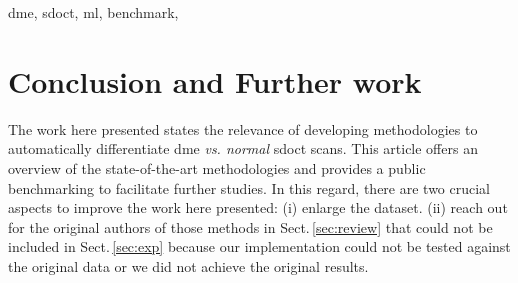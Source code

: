 \documentclass[conference,twocolumn,letterpaper,10pt]{latex/IEEEtran}
\begin{document}
\begin{IEEEkeywords}
  \glsresetall %
  \gls{dme},
  \gls{sdoct},
  \gls{ml},
  benchmark,
\end{IEEEkeywords}

\linenumbers

\glsresetall %





\section{Conclusion and Further work}\label{sec:conclusion}
The work here presented states the relevance of developing methodologies to automatically differentiate \gls{dme} \emph{vs. normal} \gls{sdoct} scans.
This article offers an overview of the state-of-the-art methodologies and provides a public benchmarking to facilitate further studies.
In this regard, there are two crucial aspects to improve the work here presented:
(i) enlarge the dataset.
(ii) reach out for the original authors of those methods in Sect.\,\ref{sec:review} that could not be included in Sect.\,\ref{sec:exp} because our implementation could not be tested against the original data or we did not achieve the original results.

\nolinenumbers

%
%

% 


\end{document}
